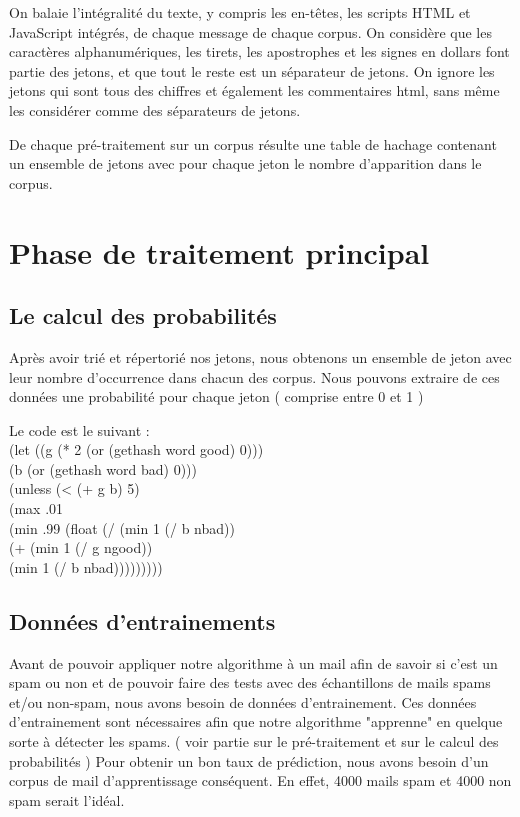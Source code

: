 \documentclass{article}
\begin{document}
On balaie l'intégralité du texte, y compris les en-têtes, les scripts HTML et JavaScript intégrés, de chaque message de chaque corpus. On considère  que les caractères alphanumériques, les tirets, les apostrophes et les signes en dollars font partie des jetons, et que tout le reste est un séparateur de jetons. On ignore les jetons qui sont tous des chiffres et également les commentaires html, sans même les considérer comme des séparateurs de jetons.

De chaque pré-traitement sur un corpus résulte une table de hachage contenant un ensemble de jetons avec pour chaque jeton le nombre d'apparition dans le corpus.

\section{Phase de traitement principal}

\subsection{Le calcul des probabilités}

Après avoir trié et répertorié nos jetons, nous obtenons un ensemble de jeton avec leur nombre d'occurrence dans chacun des corpus. Nous pouvons extraire de ces données une probabilité pour chaque jeton ( comprise entre 0 et 1 )  

Le code est le suivant : \\

(let ((g (* 2 (or (gethash word good) 0)))\\
      (b (or (gethash word bad) 0)))\\
   (unless (< (+ g b) 5)\\
     (max .01\\
          (min .99 (float (/ (min 1 (/ b nbad))\\
                             (+ (min 1 (/ g ngood))   \\
                                (min 1 (/ b nbad)))))))))\\

\subsection{Données d'entrainements}

Avant de pouvoir appliquer notre algorithme à un mail afin de savoir si c'est un spam ou non et de pouvoir faire des tests avec des échantillons de mails spams et/ou non-spam, 
nous avons besoin de données d'entrainement. Ces données d'entrainement sont nécessaires afin que notre algorithme "apprenne" en quelque sorte à détecter les spams. ( voir partie sur le pré-traitement et sur le calcul des probabilités ) 
Pour obtenir un bon taux de prédiction, nous avons besoin d'un corpus de mail d'apprentissage conséquent. En effet, 4000 mails spam et 4000 non spam serait l'idéal.
\end{document}
